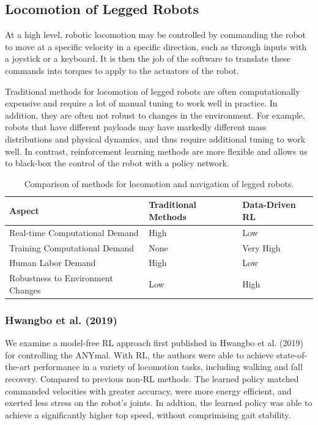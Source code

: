 \documentclass[12pt]{report}
\theoremstyle{definition}
\theoremstyle{remark}
\begin{document}
\subsection{Locomotion of Legged Robots}

At a high level, robotic locomotion may be controlled by commanding the robot to move at a specific velocity in a specific direction, such as through inputs with a joystick or a keyboard. It is then the job of the software to translate these commands into torques to apply to the actuators of the robot.

Traditional methods for locomotion of legged robots are often computationally expensive and require a lot of manual tuning to work well in practice. In addition, they are often not robust to changes in the environment. For example, robots that have different payloads may have markedly different mass distributions and physical dynamics, and thus require additional tuning to work well. In contrast, reinforcement learning methods are more flexible and allows us to black-box the control of the robot with a policy network.

\begin{table}[H]
    \centering
    \caption{Comparison of methods for locomotion and navigation of legged robots.}
    \begin{tabular}{|l|l|l|}
        \hline
        \textbf{Aspect} & \textbf{Traditional Methods} & \textbf{Data-Driven RL} \\
        \hline
        Real-time Computational Demand & High & Low \\
        Training Computational Demand & None & Very High \\
        Human Labor Demand & High & Low \\
        Robustness to Environment Changes & Low & High \\
        \hline
    \end{tabular}
    \label{tab:methods}
\end{table}

\subsubsection{Hwangbo et al. (2019)}

We examine a model-free RL approach first published in Hwangbo et al. (2019)~\cite{hwangbo_learning_2019} for controlling the ANYmal. With RL, the authors were able to achieve state-of-the-art performance in a variety of locomotion tasks, including walking and fall recovery. Compared to previous non-RL methods. The learned policy matched commanded velocities with greater accuracy, were more energy efficient, and exerted less stress on the robot's joints. In addtion, the learned policy was able to achieve a significantly higher top speed, without comprimising gait stability.
\end{document}

